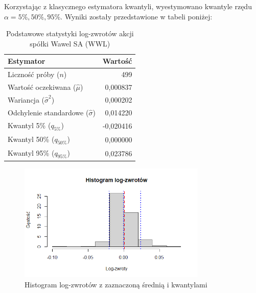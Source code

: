 \documentclass[a4paper,11pt]{article}
\begin{document}
Korzystając z klasycznego estymatora kwantyli, wyestymowano kwantyle rzędu $\alpha = 5\%, 50\%, 95\%$. Wyniki zostały przedstawione w tabeli poniżej:

\begin{table}[H]
    \centering
    \begin{tabular}{|l|r|}
        \hline
        \textbf{Estymator} & \textbf{Wartość} \\
        \hline
        Liczność próby ($n$) & 499 \\
        Wartość oczekiwana ($\hat{\mu}$) & 0,000837 \\
        Wariancja ($\hat{\sigma}^2$) & 0,000202 \\
        Odchylenie standardowe ($\hat{\sigma}$) & 0,014220 \\
        Kwantyl 5\% ($q_{5\%}$) & -0,020416 \\
        Kwantyl 50\% ($q_{50\%}$) & 0,000000 \\
        Kwantyl 95\% ($q_{95\%}$) & 0,023786 \\
        \hline
    \end{tabular}
    \caption{Podstawowe statystyki log-zwrotów akcji spółki Wawel SA (WWL)}
    \label{tab:wyniki}
\end{table}

\begin{figure}[H]
    \centering
    \includegraphics[width=0.8\textwidth]{./Wojtek/histogram-log-zwrotow.png}
    \caption{Histogram log-zwrotów z zaznaczoną średnią i kwantylami}
    \label{fig:histogram_log_zwrotow}
\end{figure}
\end{document}
